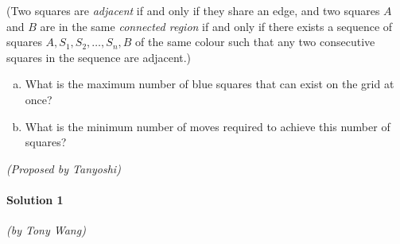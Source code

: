 \documentclass[10pt]{article}
\begin{document}
	(Two squares are \emph{adjacent} if and only if they share an edge, and two squares \(A\) and \(B\) are in the same \emph{connected region} if and only if there exists a sequence of squares \(A, S_1, S_2, \dots, S_n, B\) of the same colour such that any two consecutive squares in the sequence are adjacent.)
	
	\begin{enumerate}[(a)]
	\item What is the maximum number of blue squares that can exist on the grid at once?
	\item What is the minimum number of moves required to achieve this number of squares?
	\end{enumerate}
	
	\begin{flushright}
	\textit{(Proposed by Tanyoshi)}
	\end{flushright}
	
		\noindent \makebox[\linewidth]{\rule{\textwidth}{0.4pt}}	
	
	\paragraph{Solution 1} \textit{(by Tony Wang)}\\
	
\end{document}
